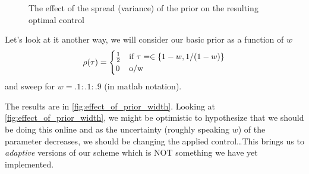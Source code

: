 \documentclass{article}
\begin{document}
\begin{figure}[h]
\begin{center}
\caption[labelInTOC]{The effect of the spread (variance) of the prior on the
resulting optimal control}
\label{fig:prior_spread}
\end{center}
\end{figure}

Let's look at it another way, we will consider our basic prior as a function of
$w$
\begin{equation}
\rho({ \tau }) = 
\begin{cases}
	\tfrac 12 & \textrm{if } { \tau }= \in \{1- w, 1/(1-w) \}\\
	0   &\textrm{o/w }
\end{cases} 
\end{equation} 
and sweep for $w = .1:.1:.9$ (in matlab notation).

The results are in \cref{fig:effect_of_prior_width}. Looking at
\cref{fig:effect_of_prior_width}, we might be optimistic to hypothesize that we
should be doing this online and as the uncertainty (roughly speaking $w$) of the
parameter decreases, we should be changing the applied control\ldots This
brings us to {\sl adaptive } versions of our scheme which is NOT something we
have yet implemented. 
 
\end{document}
